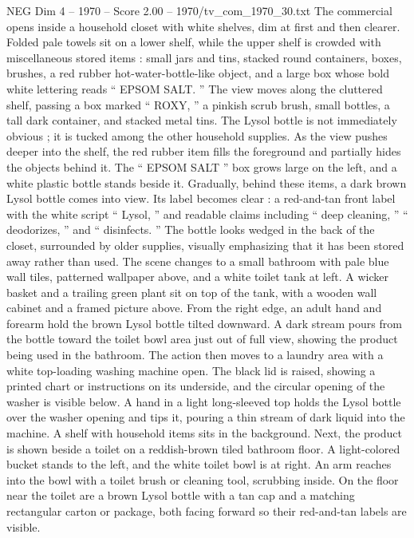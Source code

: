 \begin{textsample}{NEG Dim 4 – 1970 – Score 2.00 – 1970/tv\_com\_1970\_30.txt}  \label{ex:f4_neg_018}
The commercial opens inside a household closet with white shelves, dim at first and then clearer.
Folded pale towels sit on a lower shelf, while the upper shelf is crowded with miscellaneous stored items : small jars and tins, stacked round containers, boxes, brushes, a red rubber hot-water-bottle-like object, and a large box whose bold white lettering reads “ EPSOM SALT. ” The view moves along the cluttered shelf, passing a box marked “ ROXY, ” a pinkish scrub brush, small bottles, a tall dark container, and stacked metal tins.
The Lysol bottle is not immediately obvious ; it is tucked among the other household supplies.
As the view pushes deeper into the shelf, the red rubber item fills the foreground and partially hides the objects behind it.
The “ EPSOM SALT ” box grows large on the left, and a white plastic bottle stands beside it.
Gradually, behind these items, a dark brown Lysol bottle comes into view.
Its label becomes clear : a red-and-tan front label with the white script “ Lysol, ” and readable claims including “ deep cleaning, ” “ deodorizes, ” and “ disinfects. ” The bottle looks wedged in the back of the closet, surrounded by older supplies, visually emphasizing that it has been stored away rather than used.
The scene changes to a small bathroom with pale blue wall tiles, patterned wallpaper above, and a white toilet tank at left.
A wicker basket and a trailing green plant sit on top of the tank, with a wooden wall cabinet and a framed picture above.
From the right edge, an adult hand and forearm hold the brown Lysol bottle tilted downward.
A dark stream pours from the bottle toward the toilet bowl area just out of full view, showing the product being used in the bathroom.
The action then moves to a laundry area with a white top-loading washing machine open.
The black lid is raised, showing a printed chart or instructions on its underside, and the circular opening of the washer is visible below.
A hand in a light long-sleeved top holds the Lysol bottle over the washer opening and tips it, pouring a thin stream of dark liquid into the machine.
A shelf with household items sits in the background.
Next, the product is shown beside a toilet on a reddish-brown tiled bathroom floor.
A light-colored bucket stands to the left, and the white toilet bowl is at right.
An arm reaches into the bowl with a toilet brush or cleaning tool, scrubbing inside.
On the floor near the toilet are a brown Lysol bottle with a tan cap and a matching rectangular carton or package, both facing forward so their red-and-tan labels are visible.

\end{textsample}
